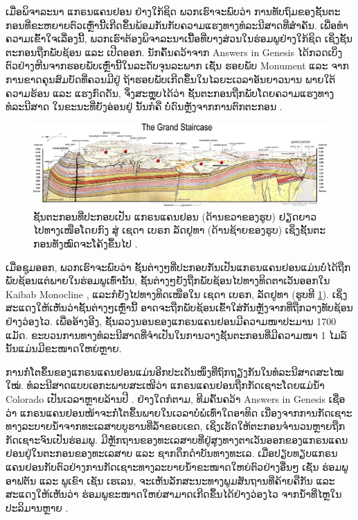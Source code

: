 \documentclass[10pt,twocolumn,letterpaper]{article}
\begin{document}
ເມື່ອພິຈາລະນາ ແກຣນແຄນຢອນ ຢ່າງໃກ້ຊິດ ພວກເຮົາຈະພົບວ່າ ການທັບຖົມຂອງຊັ້ນຕະກອນທີ່ຂະຫຍາຍຕົວເຫຼົ່ານີ້ເກີດຂຶ້ນພ້ອມກັນກັບຄວາມແຮງທາງທໍລະນີສາດທີ່ສຳຄັນ. ເພື່ອທຳຄວາມເຂົ້າໃຈເລື່ອງນີ້, ພວກເຮົາຕ້ອງພິຈາລະນາເນື້ອທີ່ບາງສ່ວນໃນຮ່ອມພູຢ່າງໃກ້ຊິດ ເຊິ່ງຊັ້ນຕະກອນຖືກພັບຊ້ອນ ແລະ ເປີດອອກ. ນັກຄົ້ນຄວ້າຈາກ Answers in Genesis \cite{42} ໄດ້ກວດເບິ່ງຕົວຢ່າງຫີນຈາກຮອຍພັບເຫຼົ່ານີ້ໃນລະດັບຈຸນລະພາກ ເຊັ່ນ ຮອຍພັບ Monument ແລະ ຈາກການຂາດຄຸນສົມບັດທີ່ຄວນມີຢູ່ ຖ້າຮອຍພັບເກີດຂຶ້ນໃນໄລຍະເວລາອັນຍາວນານ ພາຍໃຕ້ຄວາມຮ້ອນ ແລະ ແຮງກົດດັນ, ຈຶ່ງສະຫຼຸບໄດ້ວ່າ ຊັ້ນຕະກອນຖືກພັບໂດຍຄວາມແຮງທາງທໍລະນີສາດ ໃນຂະນະທີ່ຍັງອ່ອນຢູ່ ນັ້ນກໍຄື ບໍ່ດົນຫຼັງຈາກການຕົກຕະກອນ \cite{43}.

\begin{figure}
\begin{center}
\includegraphics[width=1\textwidth]{Grand_Staircase-big.jpg}
\end{center}
   \caption{ຊັ້ນຕະກອນທີ່ປະກອບເປັນ ແກຣນແຄນຢອນ (ດ້ານຂວາຂອງຮູບ) ຢຽດຍາວໄປທາງເໜືອໂດຍກົງ ສູ່ ເຊດາ ເບຣກ ລັດຢູທາ (ດ້ານຊ້າຍຂອງຮູບ) ເຊິ່ງຊັ້ນຕະກອນທັງໝົດຈະໂຄ້ງຂຶ້ນໄປ \cite{50}.}
\label{fig:4}
\end{figure}

ເມື່ອຊູມອອກ, ພວກເຮົາຈະພົບວ່າ ຊັ້ນຕ່າງໆທີ່ປະກອບກັນເປັນແກຣນແຄນຢອນແມ່ນບໍ່ໄດ້ຖືກພັບຊ້ອນແຕ່ພາຍໃນຮ່ອມພູເທົ່ານັ້ນ, ຊັ້ນຕ່າງໆຍັງຖືກພັບຊ້ອນໄປທາງທິດຕາເວັນອອກໃນ Kaibab Monocline \cite{46}, ແລະກໍຍັງໄປທາງທິດເໜືອໃນ ເຊດາ ເບຣກ, ລັດຢູທາ (ຮູບທີ \ref{fig:4}). ເຊິ່ງສະແດງໃຫ້ເຫັນວ່າຊັ້ນຕ່າງໆເຫຼົ່ານີ້ ອາດຈະຖືກພັບຊ້ອນເຂົ້າໃສ່ກັນຫຼັງຈາກທີ່ຖືກວາງທັບຊ້ອນຢ່າງວ່ອງໄວ. ເພື່ອອ້າງອີງ, ຊັ້ນລວງນອນຂອງແກຣນແຄນຢອນມີຄວາມໜາປະມານ 1700 ແມັດ. ຂະບວນການທາງທໍລະນີສາດທີ່ຈຳເປັນໃນການວາງຊັ້ນຕະກອນທີ່ມີຄວາມໜາ 1 ໄມລ໌ນັ້ນແມ່ນມີຂະໜາດໃຫຍ່ຫຼາຍ.

ການກໍ່ໂຕຂຶ້ນຂອງແກຣນແຄນຢອນແມ່ນອີກປະເດັນໜຶ່ງທີ່ຖົກຖຽງກັນໃນທໍລະນີສາດສະໄໝໃໝ່. ທໍລະນີສາດແບບເອກະພາບສະເໜີວ່າ ແກຣນແຄນຢອນຖືກກັດເຊາະໂດຍແມ່ນ້ຳ Colorado ເປັນເວລາຫຼາຍລ້ານປີ \cite{47}. ຢ່າງໃດກໍຕາມ, ທີມຄົ້ນຄວ້າ Answers in Genesis ເຊື່ອວ່າ ແກຣນແຄນຢອນໜ້າຈະກໍ່ໂຕຂຶ້ນພາຍໃນເວລາບໍ່ພໍເທົ່າໃດອາທິດ ເນື່ອງຈາກການກັດເຊາະທາງລະບາຍນ້ຳຈາກທະເລສາບບູຮານທີ່ລ້ຳຂອບເຂດ, ເຊິ່ງເຮັດໃຫ້ຕະກອນຈຳນວນຫຼາຍຖືກກັດເຊາະຈົນເປັນຮ່ອມພູ. ມີຫຼັກຖານຂອງທະເລສາບທີ່ຢູ່ສູງທາງຕາເວັນອອກຂອງແກຣນແຄນຢອນຢູ່ໃນຕະກອນຂອງທະເລສາບ ແລະ ຊາກດຶກດຳບັນທາງທະເລ. ເມື່ອປຽບທຽບແກຣນແຄນຢອນກັບຕົວຢ່າງການກັດເຊາະທາງລະບາຍນ້ຳຂະໜາດໃຫຍ່ຕົວຢ່າງອື່ນໆ ເຊັ່ນ ຮ່ອມພູ ອາຟຕັນ ແລະ ພູເຂົາ ເຊັນ ເຮເລນ, ຈະເຫັນລັກສະນະທາງພູມສັນຖານທີ່ຄ້າຍຄືກັນ ແລະ ສະແດງໃຫ້ເຫັນວ່າ ຮ່ອມພູຂະໜາດໃຫຍ່ສາມາດເກີດຂຶ້ນໄດ້ຢ່າງວ່ອງໄວ ຈາກນ້ຳທີ່ໄຫຼໃນປະລິມານຫຼາຍ \cite{48}. 
\end{document}
